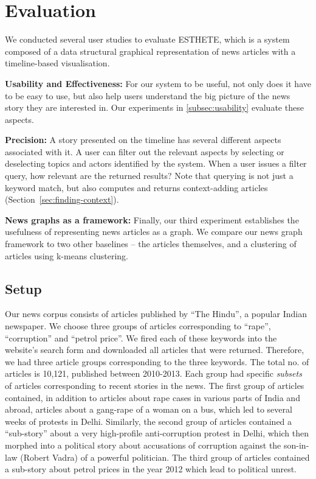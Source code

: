 \section{Evaluation}
\label{sec:eval}

We conducted several user studies to evaluate ESTHETE, which is a system composed of a data structural graphical representation of news articles with a timeline-based visualisation.

\squishlist
	
	\item {\bf Usability and Effectiveness:} For our system to be useful, not only does it have to be easy to use, but also help users understand the big picture of the news story they are interested in. Our experiments in \ref{subsec:usability} evaluate these aspects.
	
	\item {\bf Precision:} A story presented on the timeline has several different aspects associated with it.  A user can filter out the relevant aspects by selecting or deselecting topics and actors identified by the system. When a user issues a filter query, how relevant are the returned results? Note that querying is not just a keyword match, but also computes and returns context-adding articles (Section~\ref{sec:finding-context}).
	
	\item {\bf News graphs as a framework:} Finally, our third experiment establishes the usefulness of representing news articles as a graph. We compare our news graph framework to two other baselines -- the articles themselves, and a clustering of articles using k-means clustering.
	
\squishend


\subsection{Setup}
Our news corpus consists of articles published by ``The Hindu'', a popular Indian newspaper. We choose three groups of articles corresponding to ``rape'', ``corruption'' and ``petrol price''. We fired each of these keywords into the website's search form and downloaded all articles that were returned. Therefore, we had three article groups corresponding to the three keywords. The total no. of articles is 10,121, published between 2010-2013. Each group had specific \emph{subsets} of articles corresponding to recent stories in the news. The first group of articles contained, in addition to articles about rape cases in various parts of India and abroad, articles about a gang-rape of a woman on a bus, which led to several weeks of protests in Delhi. Similarly, the second group of articles contained a ``sub-story'' about a very high-profile anti-corruption protest in Delhi, which then morphed into a political story about accusations of corruption against the son-in-law (Robert Vadra) of a powerful politician. The third group of articles contained a sub-story about petrol prices in the year 2012 which lead to political unrest. %

